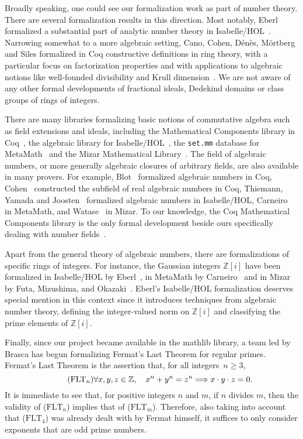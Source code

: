 \documentclass[sn-mathphys]{sn-jnl}%
\newcommand*{\refFLT}[1]{($\mathrm{FLT}_{#1}$)}
\newcommand{\mathlib}{\textsf{mathlib}\xspace}
\renewcommand{\Z}{\mathbb{Z}}
\begin{document}
Broadly speaking, one could see our formalization work as part of number theory. There are several formalization results in this direction.
Most notably, Eberl formalized a substantial part of analytic number theory in Isabelle/HOL~\cite{Eberl19}.
Narrowing somewhat to a more algebraic setting,
Cano, Cohen, Dénès, Mörtberg and Siles formalized in Coq constructive definitions in ring theory, with a particular focus on factorization properties and with applications to algebraic notions like well-founded divisibility and Krull dimension~\cite{linear-algebra-coq}.
We are not aware of any other formal developments of fractional ideals, Dedekind domains or class groups of rings of integers.

There are many libraries formalizing basic notions of commutative algebra such as field extensions and ideals, including the Mathematical Components library in Coq~\cite{mathcomp},
the algebraic library for Isabelle/HOL~\cite{algebra_isabelle},
the \texttt{set.mm} database for MetaMath~\cite{metamath} and the Mizar Mathematical Library~\cite{algebraic-hierarchy_mizar}.
The field of algebraic numbers, or more generally algebraic closures of arbitrary fields, are also available in many provers.
For example, Blot~\cite{algebraic-numbers-ccorn} formalized algebraic numbers in Coq,
Cohen~\cite{real-algebraic-numbers-coq} constructed the subfield of real algebraic numbers in Coq,
Thiemann, Yamada and Joosten~\cite{algebraic-numbers-isabelle} formalized algebraic numbers in Isabelle/HOL,
Carneiro~\cite{algebraic-numbers-metamath} in MetaMath,
and Watase~\cite{algebraic-numbers-mizar} in Mizar.
To our knowledge, the Coq Mathematical Components library is the only formal development beside ours specifically dealing with number fields~\cite[\texttt{field/algnum.v}]{mathcomp}.

Apart from the general theory of algebraic numbers, there are formalizations of specific rings of integers.
For instance, the Gaussian integers $\Z[i]$ have been formalized
in Isabelle/HOL by Eberl~\cite{gaussian_integers-isabelle},
in MetaMath by Carneiro~\cite{gaussian_integers-metamath}
and in Mizar by Futa, Mizushima, and Okazaki~\cite{gaussian_integers-mizar}.
Eberl's Isabelle/HOL formalization deserves special mention in this context since it introduces techniques from algebraic number theory,
defining the integer-valued norm on $\Z[i]$ and classifying the prime elements of $\Z[i]$.

Finally, since our project became available in the \mathlib library, a team led by Brasca has begun formalizing Fermat's Last Theorem for regular primes. Fermat's Last Theorem is the assertion that, for all integers~$n\geq 3$,
\begin{equation}\tag*{\refFLT{n}}
\forall x,y,z \in \Z, \quad x^n+y^n=z^n\Longrightarrow x\cdot y \cdot z =0.
\end{equation}
It is immediate to see that, for positive integers $n$ and $m$, if $n$ divides $m$, then the validity of \refFLT{n} implies that of \refFLT{m}.
Therefore, also taking into account that \refFLT{4} was already dealt with by Fermat himself, it suffices to only consider exponents that are odd prime numbers.
\end{document}
